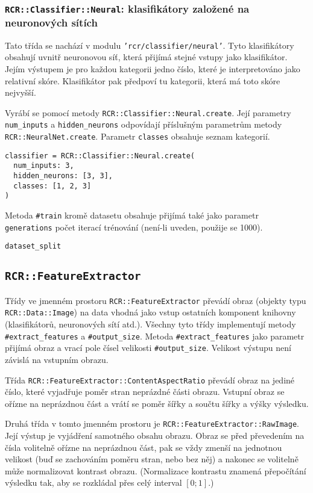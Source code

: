 \documentclass[a4paper]{article}
\begin{document}
\subsubsection{\texttt{RCR::Classifier::Neural}: klasifikátory založené na
neuronových sítích}
Tato třída se nachází v modulu \texttt{'rcr/classifier/neural'}.
Tyto klasifikátory obsahují uvnitř neuronovou síť, která přijímá stejné vstupy
jako klasifikátor. Jejím výstupem je pro každou kategorii jedno číslo, které
je interpretováno jako relativní skóre. Klasifikátor pak předpoví tu kategorii,
která má toto skóre nejvyšší.

Vyrábí se pomocí metody \texttt{RCR::Classifier::Neural.create}. Její parametry
\texttt{num\_inputs} a \texttt{hidden\_neurons} odpovídají příslušným parametrům
metody \texttt{RCR::NeuralNet.create}. Parametr \texttt{classes} obsahuje seznam
kategorií.
\begin{lstlisting}
classifier = RCR::Classifier::Neural.create(
  num_inputs: 3,
  hidden_neurons: [3, 3],
  classes: [1, 2, 3]
)
\end{lstlisting}

Metoda \texttt{\#train} kromě datasetu obsahuje přijímá také jako parametr
\texttt{generations} počet iterací trénování (není-li uveden, použije se 1000).

\texttt{dataset\_split}

\subsection{\texttt{RCR::FeatureExtractor}}
Třídy ve jmenném prostoru \texttt{RCR::FeatureExtractor} převádí obraz (objekty
typu \texttt{RCR::Data::Image}) na data vhodná jako vstup ostatních komponent
knihovny (klasifikátorů, neuronových sítí atd.).
Všechny tyto třídy implementují metody \texttt{\#extract\_features} a
\texttt{\#output\_size}. Metoda \texttt{\#extract\_features} jako parametr
přijímá obraz a vrací pole čísel velikosti \texttt{\#output\_size}.
Velikost výstupu není závislá na vstupním obrazu.


Třída \texttt{RCR::FeatureExtractor::ContentAspectRatio} převádí obraz na jediné
číslo, které vyjadřuje poměr stran neprázdné části obrazu. Vstupní obraz se
ořízne na neprázdnou část a vrátí se poměr šířky a součtu šířky a výšky výsledku.

Druhá třída v tomto jmenném prostoru je \texttt{RCR::FeatureExtractor::RawImage}.
Její výstup je vyjádření samotného obsahu obrazu. Obraz se před převedením na
čísla volitelně ořízne na neprázdnou část, pak se vždy zmenší na jednotnou velikost
(buď se zachováním poměru stran, nebo bez něj) a nakonec se volitelně může
normalizovat kontrast obrazu. (Normalizace kontrastu znamená přepočítání
výsledku tak, aby se rozkládal přes celý interval $[0;1]$.)
\end{document}

